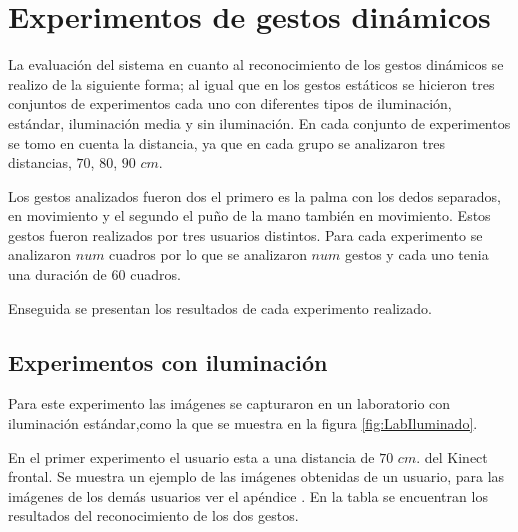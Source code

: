 



\section{Experimentos de gestos dinámicos}\label{TestDinamicGestures} 

La evaluación del sistema en cuanto al reconocimiento de los gestos dinámicos se realizo de la siguiente forma; al igual que en los gestos estáticos se hicieron tres conjuntos de experimentos cada uno con diferentes tipos de iluminación, estándar, iluminación media y sin iluminación. En cada conjunto de experimentos se tomo en cuenta la distancia, ya que en cada grupo se analizaron tres distancias, $70$, $80$, $90$ $cm$. 

Los gestos analizados fueron dos el primero es la palma con los dedos separados, en movimiento y el segundo el puño de la mano también en movimiento. Estos gestos fueron realizados por tres usuarios distintos. Para cada experimento se analizaron $num$ cuadros por lo que se analizaron $num$ gestos y cada uno tenia una duración de $60$ cuadros.  

Enseguida se presentan los resultados de cada experimento realizado. 

\subsection{Experimentos con iluminación} 
Para este experimento las imágenes se capturaron en un laboratorio con iluminación estándar,como la que se muestra en la figura \ref{fig:LabIluminado}.

En el primer experimento el usuario esta a una distancia de $70$ $cm.$ del Kinect frontal. Se muestra un ejemplo de las imágenes obtenidas de un usuario, para las imágenes de los demás usuarios ver el apéndice . En la tabla se encuentran los resultados del reconocimiento de los dos gestos.  


